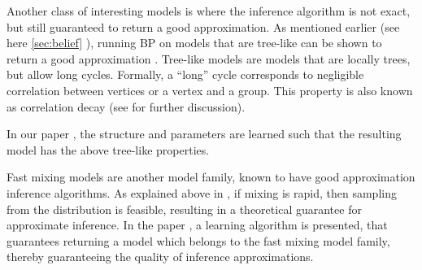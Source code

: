 Another class of interesting models is where the inference algorithm is not exact, but still guaranteed to return a good approximation. 
As mentioned earlier (see here \ref{sec:belief} ), running BP on models that are tree-like can be shown to return a good approximation \cite{dembo2010ising}.
Tree-like models are models that are locally trees, but allow long cycles.
Formally, a ``long'' cycle corresponds to negligible correlation between vertices or a vertex and a group. This property is also known as correlation decay (see  for further discussion).
In our paper \cite{heinemann2014inferning}, the structure and parameters are learned such that the resulting model has the above tree-like properties.
%

Fast mixing models are another model family,  known to have good approximation inference algorithms.
As explained above in , if mixing is rapid, then sampling from the distribution is feasible, resulting in a theoretical guarantee for approximate inference. 
In the paper \cite{domke2015maximum}, a learning algorithm is presented, that guarantees returning a model which belongs to the fast mixing model family,
thereby guaranteeing the quality of inference approximations.

